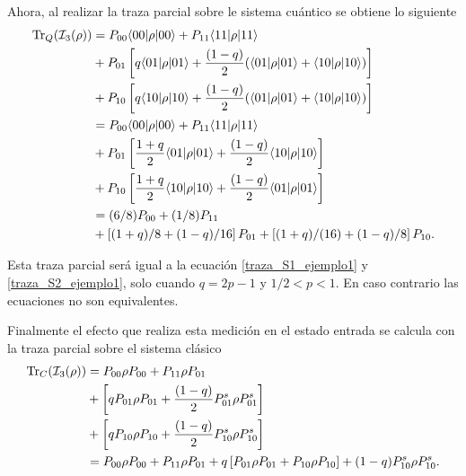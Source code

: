 Ahora, al realizar la traza parcial sobre le sistema cuántico se obtiene lo siguiente
\begin{equation}\label{traza_S3_ejemplo1}
    \begin{split}
        {\rm Tr}_Q(\mathcal{I}_3(\rho)) 
        &=P_{00} \langle 00|\rho|00\rangle + P_{11} \langle 11|\rho|11\rangle\\
        &+P_{01}  \left[q \langle 01|\rho| 01\rangle+ \frac{(1-q)}{2} (\langle 01|\rho |01\rangle +\langle 10 |\rho |10\rangle)\right] \\
        &+P_{10}  \left[q \langle 10|\rho| 10\rangle+ \frac{(1-q)}{2} (\langle 01|\rho| 01\rangle +\langle 10 |\rho |10\rangle)\right] \\
        &=P_{00} \langle 00|\rho|00\rangle + P_{11} \langle 11|\rho|11\rangle\\
        &+P_{01}  \left[\frac{1+q}{2}\langle 01|\rho| 01\rangle+ \frac{(1-q)}{2} \langle 10 |\rho |10\rangle\right] \\
        &+P_{10}  \left[\frac{1+q}{2}\langle 10|\rho| 10\rangle+ \frac{(1-q)}{2} \langle 01 |\rho |01\rangle\right] \\
        &=(6/8)P_{00} + (1/8)P_{11}\\
        &+  \left[(1+q)/8+ (1-q)/16\right] P_{01}+  \left[(1+q)/(16)+ (1-q)/8 \right] P_{10}.\\
    \end{split}
\end{equation}

Esta traza parcial será igual a la ecuación {\ref{traza_S1_ejemplo1}} y {\ref{traza_S2_ejemplo1}}, solo cuando $q=2p-1$ y $1/2<p<1$. En caso contrario las ecuaciones no son equivalentes. 

Finalmente el efecto que realiza esta medición en el estado entrada se calcula con la traza parcial sobre el sistema clásico \begin{equation}\label{traza_A3_ejemplo1}
    \begin{split}
        {\rm Tr}_C(\mathcal{I}_3(\rho)) &=P_{00} \rho P_{00} + P_{11} \rho P_{01}\\
        &+\left[qP_{01}\rho P_{01}+ \frac{(1-q)}{2} P^s_{01}\rho P^s_{01}\right] \\
        &+\left[qP_{10}\rho P_{10}+ \frac{(1-q)}{2} P^s_{10}\rho P^s_{10}\right]\\
        &=P_{00} \rho P_{00} + P_{11} \rho P_{01}+q\left[P_{01}\rho P_{01}+ P_{10}\rho P_{10}\right]+{(1-q)} P^s_{10}\rho P^s_{10}.\\
    \end{split}
\end{equation}

